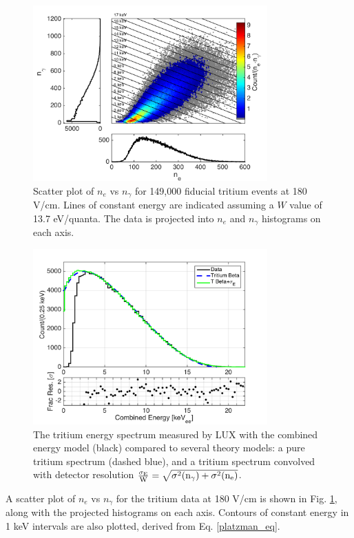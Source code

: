 \begin{figure}[h!]\centering
\includegraphics[width=90mm]{fig/tritium_scatter.png}
\caption{Scatter plot of $n_e$ vs $n_{\gamma}$ for 149,000 fiducial tritium events at 180 V/cm. Lines of constant energy are indicated assuming a $W$ value of 13.7 eV/quanta. The data is projected into $n_e$ and $n_{\gamma}$ histograms on each axis.}
\label{fig:tritium-scatter}
\end{figure}


\begin{figure}[h!]
\begin{center}
\includegraphics[width=90mm]{fig/tritium-spectrum-linear.png}
\caption{The tritium energy spectrum measured by LUX with the combined energy model (black) compared to several theory models: a pure tritium spectrum (dashed blue), and a tritium spectrum convolved with detector resolution  $\rm \frac{\sigma_E}{W} = \sqrt{\sigma^2(n_{\gamma})+ \sigma^2(n_e)}$. }
\label{fig:tritium-spectrum}
\end{center}
\end{figure}


A scatter plot of $n_e$ vs $n_{\gamma}$ for the tritium data at 180 V/cm is shown in Fig. \ref{fig:tritium-scatter}, along with the projected histograms on each axis. Contours of constant energy in 1 keV intervals are also plotted, derived from Eq. \ref{platzman_eq}. 


